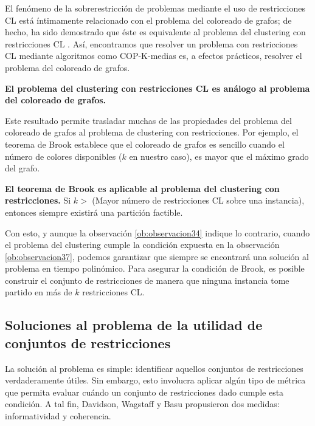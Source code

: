 El fenómeno de la sobrerestricción de problemas mediante el uso de restricciones \acf{CL} está íntimamente relacionado con el problema del coloreado de grafos; de hecho, ha sido demostrado que éste es equivalente al problema del clustering con restricciones \acs{CL} \cite{DavidsonRavi:2006}. Así, encontramos que resolver un problema con restricciones \acs{CL} mediante algoritmos como COP-K-medias es, a efectos prácticos, resolver el problema del coloreado de grafos.

\begin{observacion}
	
	\textbf{El problema del clustering con restricciones \acs{CL} es análogo al problema del coloreado de grafos.} \cite{Survey:2007}
	
\end{observacion}

Este resultado permite trasladar muchas de las propiedades del problema del coloreado de grafos al problema de clustering con restricciones. Por ejemplo, el teorema de Brook establece que el coloreado de grafos es sencillo cuando el número de colores disponibles ($k$ en nuestro caso), es mayor que el máximo grado del grafo. 

\begin{observacion}
	
	\textbf{El teorema de Brook es aplicable al problema del clustering con restricciones.}
	Si $ k > $ (Mayor número de restricciones \acs{CL} sobre una instancia), entonces siempre existirá una partición factible. \cite{Survey:2007} \label{ob:observacion37}
	
\end{observacion}

Con esto, y aunque la observación \ref{ob:observacion34} indique lo contrario, cuando el problema del clustering cumple la condición expuesta en la observación \ref{ob:observacion37}, podemos garantizar que siempre se encontrará una solución al problema en tiempo polinómico. Para asegurar la condición de Brook, es posible construir el conjunto de restricciones de manera que ninguna instancia tome partido en más de $k$ restricciones \acf{CL}. \cite{DavidsonRavi:2006}

\subsection{Soluciones al problema de la utilidad de conjuntos de restricciones}

La solución al problema es simple: identificar aquellos conjuntos de restricciones verdaderamente útiles. Sin embargo, esto involucra aplicar algún tipo de métrica que permita evaluar cuándo un conjunto de restricciones dado cumple esta condición. A tal fin, Davidson, Wagstaff y Basu propusieron dos medidas: informatividad y coherencia.\\

